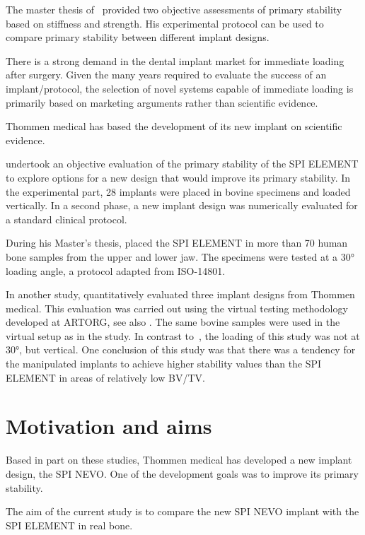 \documentclass[12pt, a4paper, twoside]{report}
\begin{document}
The master thesis of~\citet{voumard_peroperative_2019} provided two objective assessments of primary stability based on stiffness and strength.
His experimental protocol can be used to compare primary stability between different implant designs.

There is a strong demand in the dental implant market for immediate loading after surgery.
Given the many years required to evaluate the success of an implant/protocol, the selection of novel systems capable of immediate loading is primarily based on marketing arguments rather than scientific evidence.

Thommen medical has based the development of its new implant on scientific evidence.

\cite{wili_experimental_2021} undertook an objective evaluation of the primary stability of the SPI ELEMENT to explore options for a new design that would improve its primary stability.
In the experimental part, 28 implants were placed in bovine specimens and loaded vertically.
In a second phase, a new implant design was numerically evaluated for a standard clinical protocol.

During his Master's thesis, \citet{thierrin_primary_2022} placed the SPI ELEMENT in more than 70 human bone samples from the upper and lower jaw.
The specimens were tested at a 30° loading angle, a protocol adapted from ISO-14801.

In another study, \citet{wili_virtual_2022} quantitatively evaluated three implant designs from Thommen medical.
This evaluation was carried out using the virtual testing methodology developed at ARTORG, see also \cite{wili_experimental_2021}.
The same bovine samples were used in the virtual setup as in the \cite{wili_experimental_2021} study.
In contrast to~\citet{thierrin_primary_2022}, the loading of this study was not at 30°, but vertical.
One conclusion of this study was that there was a tendency for the manipulated implants to achieve higher stability values than the SPI ELEMENT in areas of relatively low BV/TV.


\section{Motivation and aims}
%
Based in part on these studies, Thommen medical has developed a new implant design, the SPI NEVO.
One of the development goals was to improve its primary stability.

The aim of the current study is to compare the new SPI NEVO implant with the SPI ELEMENT in real bone.
\end{document}
